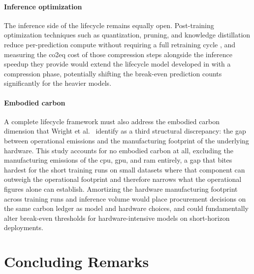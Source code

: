 \paragraph{Inference optimization}
The inference side of the lifecycle remains equally open. Post-training optimization techniques such as quantization, pruning, and knowledge distillation reduce per-prediction compute without requiring a full retraining cycle \cite{pattersonCarbonEmissionsLarge2021}, and measuring the \gls{co2eq} cost of those compression steps alongside the inference speedup they provide would extend the lifecycle model developed in  with a compression phase, potentially shifting the break-even prediction counts significantly for the heavier models.

\paragraph{Embodied carbon}
A complete lifecycle framework must also address the embodied carbon dimension that Wright et al.\ \parencite{wrightEfficiencyNotEnough2025} identify as a third structural discrepancy: the gap between operational emissions and the manufacturing footprint of the underlying hardware. This study accounts for no embodied carbon at all, excluding the manufacturing emissions of the \gls{cpu}, \gls{gpu}, and \gls{ram} entirely, a gap that bites hardest for the short training runs on small datasets where that component can outweigh the operational footprint and therefore narrows what the operational figures alone can establish. Amortizing the hardware manufacturing footprint across training runs and inference volume would place procurement decisions on the same carbon ledger as model and hardware choices, and could fundamentally alter break-even thresholds for hardware-intensive models on short-horizon deployments.

\section{Concluding Remarks}
\label{sec:concluding_remarks}

